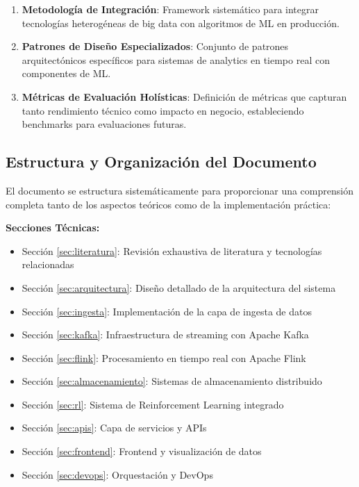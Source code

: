 \documentclass[conference,10pt,letterpaper]{IEEEtran}
\begin{document}
\begin{enumerate}[leftmargin=*, itemsep=0.1cm]
\item \textbf{Metodología de Integración}: Framework sistemático para integrar tecnologías heterogéneas de big data con algoritmos de ML en producción.

\item \textbf{Patrones de Diseño Especializados}: Conjunto de patrones arquitectónicos específicos para sistemas de analytics en tiempo real con componentes de ML.

\item \textbf{Métricas de Evaluación Holísticas}: Definición de métricas que capturan tanto rendimiento técnico como impacto en negocio, estableciendo benchmarks para evaluaciones futuras.
\end{enumerate}

\subsection{Estructura y Organización del Documento}
\label{subsec:estructura}

El documento se estructura sistemáticamente para proporcionar una comprensión completa tanto de los aspectos teóricos como de la implementación práctica:

\textbf{Secciones Técnicas:}
\begin{itemize}[leftmargin=*, itemsep=0.05cm]
\item Sección \ref{sec:literatura}: Revisión exhaustiva de literatura y tecnologías relacionadas
\item Sección \ref{sec:arquitectura}: Diseño detallado de la arquitectura del sistema  
\item Sección \ref{sec:ingesta}: Implementación de la capa de ingesta de datos
\item Sección \ref{sec:kafka}: Infraestructura de streaming con Apache Kafka
\item Sección \ref{sec:flink}: Procesamiento en tiempo real con Apache Flink
\item Sección \ref{sec:almacenamiento}: Sistemas de almacenamiento distribuido
\item Sección \ref{sec:rl}: Sistema de Reinforcement Learning integrado
\item Sección \ref{sec:apis}: Capa de servicios y APIs
\item Sección \ref{sec:frontend}: Frontend y visualización de datos
\item Sección \ref{sec:devops}: Orquestación y DevOps
\end{itemize}
\end{document}
